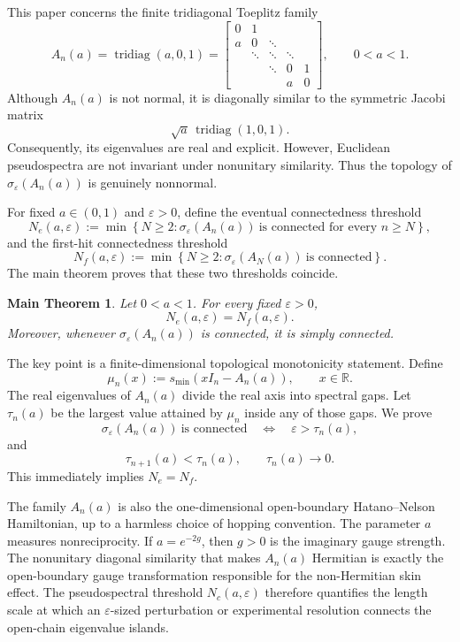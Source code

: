 \documentclass[11pt]{amsart}
\numberwithin{equation}{section}
\DeclareMathOperator{\tridiag}{tridiag}
\newcommand{\R}{\mathbb R}
\newcommand{\eps}{\varepsilon}
\newcommand{\A}{A}
\newtheorem{mainthm}[theorem]{Main Theorem}
\begin{document}
This paper concerns the finite tridiagonal Toeplitz family
\[
\A_n(a)
=
\tridiag(a,0,1)
=
\begin{bmatrix}
0 & 1 \\
a & 0 & \ddots \\
& \ddots & \ddots & \ddots \\
&& \ddots & 0 & 1 \\
&&& a & 0
\end{bmatrix},
\qquad 0<a<1.
\]
Although \(\A_n(a)\) is not normal, it is diagonally similar to the symmetric Jacobi matrix
\[
\sqrt a\,\tridiag(1,0,1).
\]
Consequently, its eigenvalues are real and explicit.  However, Euclidean pseudospectra are not invariant under nonunitary similarity.  Thus the topology of \(\sigma_\eps(\A_n(a))\) is genuinely nonnormal.

For fixed \(a\in(0,1)\) and \(\eps>0\), define the eventual connectedness threshold
\[
N_e(a,\eps)
:=
\min
\left\{
N\ge2:
\sigma_\eps(\A_n(a))\ \text{is connected for every }n\ge N
\right\},
\]
and the first-hit connectedness threshold
\[
N_f(a,\eps)
:=
\min
\left\{
N\ge2:
\sigma_\eps(\A_N(a))\ \text{is connected}
\right\}.
\]
The main theorem proves that these two thresholds coincide.

\begin{mainthm}\label{thm:main}
Let \(0<a<1\).  For every fixed \(\eps>0\),
\[
N_e(a,\eps)=N_f(a,\eps).
\]
Moreover, whenever \(\sigma_\eps(\A_n(a))\) is connected, it is simply connected.
\end{mainthm}

The key point is a finite-dimensional topological monotonicity statement.  Define
\[
\mu_n(x):=s_{\min}(xI_n-\A_n(a)),\qquad x\in\R.
\]
The real eigenvalues of \(\A_n(a)\) divide the real axis into spectral gaps.  Let \(\tau_n(a)\) be the largest value attained by \(\mu_n\) inside any of those gaps.  We prove
\[
\sigma_\eps(\A_n(a))\ \text{is connected}
\quad\Longleftrightarrow\quad
\eps>\tau_n(a),
\]
and
\[
\tau_{n+1}(a)<\tau_n(a),\qquad \tau_n(a)\to0.
\]
This immediately implies \(N_e=N_f\).

The family \(\A_n(a)\) is also the one-dimensional open-boundary Hatano--Nelson Hamiltonian, up to a harmless choice of hopping convention.  The parameter \(a\) measures nonreciprocity.  If \(a=e^{-2g}\), then \(g>0\) is the imaginary gauge strength.  The nonunitary diagonal similarity that makes \(\A_n(a)\) Hermitian is exactly the open-boundary gauge transformation responsible for the non-Hermitian skin effect.  The pseudospectral threshold \(N_c(a,\eps)\) therefore quantifies the length scale at which an \(\eps\)-sized perturbation or experimental resolution connects the open-chain eigenvalue islands.
\end{document}
